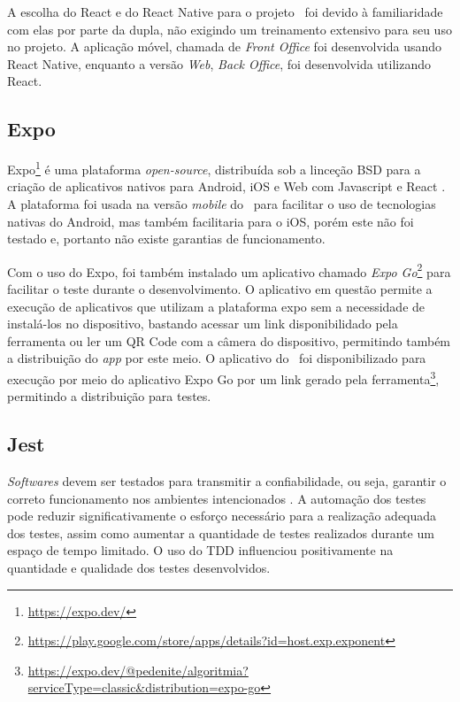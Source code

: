 A escolha do React e do React Native para o projeto \appName\ foi devido à familiaridade com elas por parte da dupla, não exigindo um treinamento extensivo para seu uso no projeto. A aplicação móvel, chamada de \textit{Front Office} foi desenvolvida usando React Native, enquanto a versão \textit{Web}, \textit{Back Office}, foi desenvolvida utilizando React.

\subsection{Expo}

Expo\footnote{\url{https://expo.dev/}} é uma plataforma \textit{open-source}, distribuída sob a linceção BSD para a criação de aplicativos nativos para Android, iOS e Web com Javascript e React \cite{expo}. A plataforma foi usada na versão \textit{mobile} do \appName\ para facilitar o uso de tecnologias nativas do Android, mas também facilitaria para o iOS, porém este não foi testado e, portanto não existe garantias de funcionamento.

Com o uso do Expo, foi também instalado um aplicativo chamado \textit{Expo Go}\footnote{\url{https://play.google.com/store/apps/details?id=host.exp.exponent}} para facilitar o teste durante o desenvolvimento. O aplicativo em questão permite a execução de aplicativos que utilizam a plataforma expo sem a necessidade de instalá-los no dispositivo, bastando acessar um link disponibilidado pela ferramenta ou ler um QR Code com a câmera do dispositivo, permitindo também a distribuição do \textit{app} por este meio. O aplicativo do \appName\ foi disponibilizado para execução por meio do aplicativo Expo Go por um link gerado pela ferramenta\footnote{\url{https://expo.dev/@pedenite/algoritmia?serviceType=classic&distribution=expo-go}}, permitindo a distribuição para testes.

\subsection{Jest}

\textit{Softwares} devem ser testados para transmitir a confiabilidade, ou seja, garantir o correto funcionamento nos ambientes intencionados \cite{test_automation}. A automação dos testes pode reduzir significativamente o esforço necessário para a realização adequada dos testes, assim como aumentar a quantidade de testes realizados durante um espaço de tempo limitado. O uso do TDD \cite{tdd} influenciou positivamente na quantidade e qualidade dos testes desenvolvidos.


